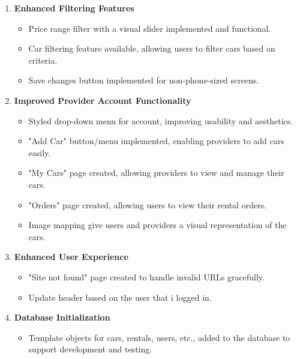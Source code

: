 \documentclass[a4paper,12pt]{article}
\begin{document}
\begin{enumerate}
    \item \textbf{Enhanced Filtering Features}
    \begin{itemize}
        \item Price range filter with a visual slider implemented and functional.
        \item Car filtering feature available, allowing users to filter cars based on criteria.
        \item Save changes button implemented for non-phone-sized screens.
    \end{itemize}
    \item \textbf{Improved Provider Account Functionality}
    \begin{itemize}
        \item Styled drop-down menu for account, improving usability and aesthetics.
        \item "Add Car" button/menu implemented, enabling providers to add cars easily.
        \item "My Cars" page created, allowing providers to view and manage their cars.
        \item "Orders" page created, allowing users to view their rental orders.
        \item Image mapping give users and providers a visual representation of the cars.
    \end{itemize}
    \item \textbf{Enhanced User Experience}
    \begin{itemize}
        \item "Site not found" page created to handle invalid URLs gracefully.
        \item  Update header based on the user that i logged in. 
    \end{itemize}
    \item \textbf{Database Initialization}
    \begin{itemize}
        \item Template objects for cars, rentals, users, etc., added to the database to support development and testing.
    \end{itemize}
\end{enumerate}
\end{document}
